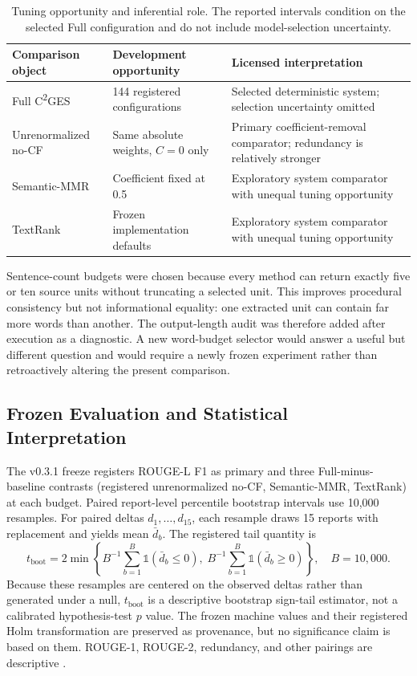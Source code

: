 \documentclass[applsci,article,submit,moreauthors]{Definitions/mdpi}
\newcommand{\cges}{C\textsuperscript{2}GES}
\begin{document}
\begin{table}[H]
\caption{Tuning opportunity and inferential role. The reported intervals condition on the selected Full configuration and do not include model-selection uncertainty.}
\label{tab:tuning-opportunity}\centering\small
\begin{tabular}{p{}p{}p{}}
\toprule
Comparison object & Development opportunity & Licensed interpretation\\
\midrule
Full \cges{} & 144 registered configurations & Selected deterministic system; selection uncertainty omitted\\
Unrenormalized no-CF & Same absolute weights, $C=0$ only & Primary coefficient-removal comparator; redundancy is relatively stronger\\
Semantic-MMR & Coefficient fixed at 0.5 & Exploratory system comparator with unequal tuning opportunity\\
TextRank & Frozen implementation defaults & Exploratory system comparator with unequal tuning opportunity\\
\bottomrule
\end{tabular}
\end{table}

Sentence-count budgets were chosen because every method can return exactly five or ten source units without truncating a selected unit. This improves procedural consistency but not informational equality: one extracted unit can contain far more words than another. The output-length audit was therefore added after execution as a diagnostic. A new word-budget selector would answer a useful but different question and would require a newly frozen experiment rather than retroactively altering the present comparison.

\subsection{Frozen Evaluation and Statistical Interpretation}

The v0.3.1 freeze registers ROUGE-L F1 as primary and three Full-minus-baseline contrasts (registered unrenormalized no-CF, Semantic-MMR, TextRank) at each budget. Paired report-level percentile bootstrap intervals use 10,000 resamples. For paired deltas $d_1,\ldots,d_{15}$, each resample draws 15 reports with replacement and yields mean $\bar d_b$. The registered tail quantity is
\begin{equation}
t_{\mathrm{boot}}=2\min\left\{B^{-1}\sum_{b=1}^{B}\mathbb{1}(\bar d_b\leq0),\;B^{-1}\sum_{b=1}^{B}\mathbb{1}(\bar d_b\geq0)\right\},\quad B=10{,}000.
\end{equation}
Because these resamples are centered on the observed deltas rather than generated under a null, $t_{\mathrm{boot}}$ is a descriptive bootstrap sign-tail estimator, not a calibrated hypothesis-test $p$ value. The frozen machine values and their registered Holm transformation are preserved as provenance, but no significance claim is based on them. ROUGE-1, ROUGE-2, redundancy, and other pairings are descriptive \cite{cameron2008bootstrap}.
\end{document}
